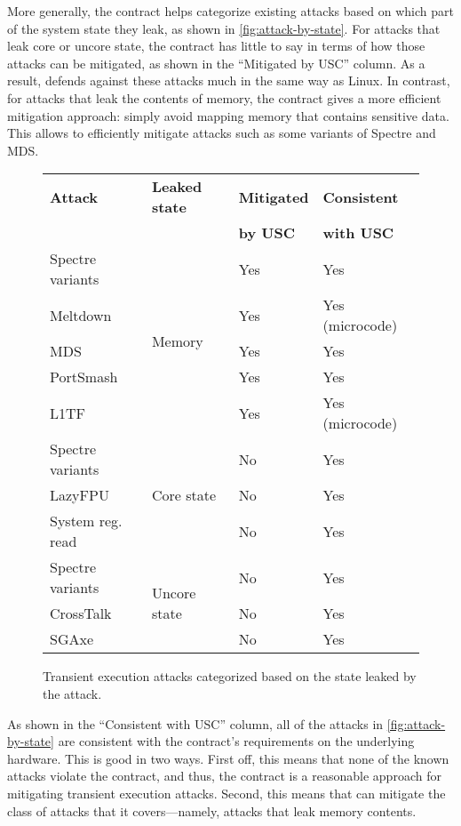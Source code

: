 More generally, the contract helps categorize existing attacks
based on which part of the system state they leak, as shown in
\autoref{fig:attack-by-state}.  For attacks that leak core or uncore
state, the contract has little to say in terms of how those attacks
can be mitigated, as shown in the ``Mitigated by USC'' column.  As a
result, \sys defends against these attacks much in the same way as Linux.
In contrast, for attacks that leak the contents of memory, the contract
gives a more efficient mitigation approach: simply avoid mapping memory
that contains sensitive data.  This allows \sys to efficiently mitigate
attacks such as some variants of Spectre and MDS.

\begin{figure}
\small
\centering
\begin{tabular}{@{}llll@{}}
\textbf{Attack} & \textbf{Leaked state} & \textbf{Mitigated} & \textbf{Consistent} \\
&& \textbf{by USC} & \textbf{with USC} \\
\midrule

Spectre variants & \multirow{5}{0.75in}{Memory} & Yes & Yes\\
Meltdown & & Yes & Yes (microcode)\\
MDS & & Yes & Yes\\
PortSmash & & Yes & Yes\\
L1TF & & Yes & Yes (microcode)\\

\midrule

Spectre variants & \multirow{3}{0.75in}{Core state} & No & Yes \\
LazyFPU & & No & Yes \\
System reg. read & & No & Yes \\

\midrule

Spectre variants & \multirow{3}{0.75in}{Uncore state} & No & Yes \\
CrossTalk & & No & Yes \\
SGAxe & & No & Yes \\

\end{tabular}
\caption{Transient execution attacks categorized based on the
  state leaked by the attack.}
\label{fig:attack-by-state}
\end{figure}

As shown in the ``Consistent with USC'' column, all of the attacks
in \autoref{fig:attack-by-state} are consistent with the contract's
requirements on the underlying hardware.  This is good in two ways.
First off, this means that none of the known attacks violate the contract,
and thus, the contract is a reasonable approach for mitigating transient
execution attacks.  Second, this means that \contract can mitigate
the class of attacks that it covers---namely, attacks that leak memory
contents.

